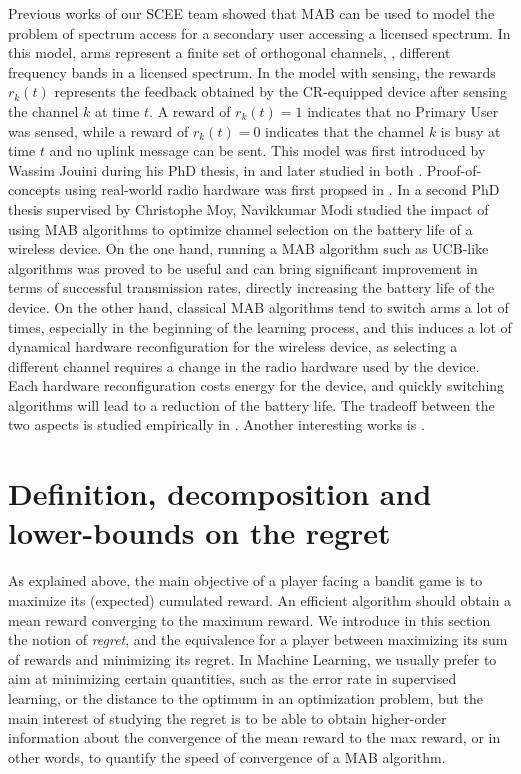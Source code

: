 Previous works of our SCEE team showed that MAB can be used to model the problem of spectrum access for a secondary user accessing a licensed spectrum.
In this model, arms represent a finite set of orthogonal channels, \ie, different frequency bands in a licensed spectrum.
In the model with sensing, the rewards $r_k(t)$ represents the feedback obtained by the CR-equipped device after sensing the channel $k$ at time $t$.
A reward of $r_k(t) = 1$ indicates that no Primary User was sensed, while a reward of $r_k(t)=0$ indicates that the channel $k$ is busy at time $t$ and no uplink message can be sent.
%
This model was first introduced by Wassim Jouini during his PhD thesis,
in \cite{Jouini09} and later studied in both \cite{Jouini10,Jouini12}.
Proof-of-concepts using real-world radio hardware was first propsed in \cite{MoyWSR2014,RobertSDR2014}.
In a second PhD thesis supervised by Christophe Moy, Navikkumar Modi studied the impact
of using MAB algorithms to optimize channel selection
on the battery life of a wireless device.
On the one hand, running a MAB algorithm such as UCB-like algorithms was proved to be useful and can bring significant improvement in terms of successful transmission rates, directly increasing the battery life of the device.
On the other hand, classical MAB algorithms tend to switch arms a lot of times, especially in the beginning of the learning process, and this induces a lot of dynamical hardware reconfiguration for the wireless device, as selecting a different channel requires a change in the radio hardware used by the device.
Each hardware reconfiguration costs energy for the device, and quickly switching algorithms will lead to a reduction of the battery life.
The tradeoff between the two aspects is studied empirically in
\cite{modiDemo2016}.
%
Another interesting works is \cite{Modi17QoS}.



\section{Definition, decomposition and lower-bounds on the regret}
\label{sec:2:lowerUpperBoundsRegret}

As explained above, the main objective of a player facing a bandit game is to maximize its (expected) cumulated reward.
An efficient algorithm should obtain a mean reward converging to the maximum reward.
We introduce in this section the notion of \emph{regret}, and the equivalence for a player between maximizing its sum of rewards and minimizing its regret.
In Machine Learning, we usually prefer to aim at minimizing certain quantities, such as the error rate in supervised learning, or the distance to the optimum in an optimization problem,
but the main interest of studying the regret is to be able to obtain higher-order information about the convergence of the mean reward to the max reward,
or in other words, to quantify the speed of convergence of a MAB algorithm.


